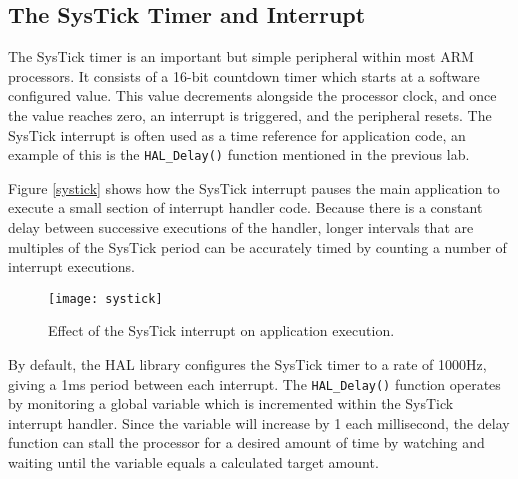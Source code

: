 \documentclass[11pt,fleqn]{book} %
\begin{document}
\subsection{The SysTick Timer and Interrupt}
The SysTick timer is an important but simple peripheral within most ARM processors. It consists of a 16-bit countdown timer which starts at a software configured value. This value decrements alongside the processor clock, and once the value reaches zero, an interrupt is triggered, and the peripheral resets. The SysTick interrupt is often used as a time reference for application code, an example of this is the \texttt{HAL\_Delay()} function mentioned in the previous lab. 

Figure \vref{systick} shows how the SysTick interrupt pauses the main application to execute a small section of interrupt handler code. Because there is a constant delay between successive executions of the handler, longer intervals that are multiples of the SysTick period can be accurately timed by counting a number of interrupt executions.  

\begin{figure}[h]
    \centering\texttt{[image: systick]}
    \caption{Effect of the SysTick interrupt on application execution.}
    \label{systick}
\end{figure}

By default, the HAL library configures the SysTick timer to a rate of 1000Hz, giving a 1ms period between each interrupt. The \texttt{HAL\_Delay()} function operates by monitoring a global variable which is incremented within the SysTick interrupt handler. Since the variable will increase by 1 each millisecond, the delay function can stall the processor for a desired amount of time by watching and waiting until the variable equals a calculated target amount. 
\end{document}
